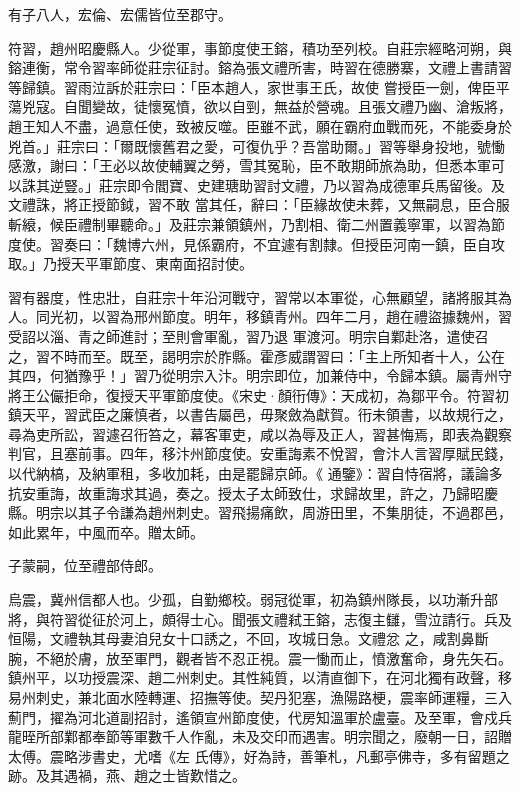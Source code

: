 \begin{pinyinscope}
 有子八人，宏倫、宏儒皆位至郡守。



 符習，趙州昭慶縣人。少從軍，事節度使王鎔，積功至列校。自莊宗經略河朔，與鎔連衡，常令習率師從莊宗征討。鎔為張文禮所害，時習在德勝寨，文禮上書請習等歸鎮。習雨泣訴於莊宗曰：「臣本趙人，家世事王氏，故使
 嘗授臣一劍，俾臣平蕩兇寇。自聞變故，徒懷冤憤，欲以自剄，無益於營魂。且張文禮乃幽、滄叛將，趙王知人不盡，過意任使，致被反噬。臣雖不武，願在霸府血戰而死，不能委身於兇首。」莊宗曰：「爾既懷舊君之愛，可復仇乎？吾當助爾。」習等舉身投地，號慟感激，謝曰：「王必以故使輔翼之勞，雪其冤恥，臣不敢期師旅為助，但悉本軍可以誅其逆豎。」莊宗即令閻寶、史建瑭助習討文禮，乃以習為成德軍兵馬留後。及文禮誅，將正授節鉞，習不敢
 當其任，辭曰：「臣緣故使未葬，又無嗣息，臣合服斬縗，候臣禮制畢聽命。」及莊宗兼領鎮州，乃割相、衛二州置義寧軍，以習為節度使。習奏曰：「魏博六州，見係霸府，不宜遽有割隸。但授臣河南一鎮，臣自攻取。」乃授天平軍節度、東南面招討使。



 習有器度，性忠壯，自莊宗十年沿河戰守，習常以本軍從，心無顧望，諸將服其為人。同光初，以習為邢州節度。明年，移鎮青州。四年二月，趙在禮盜據魏州，習受詔以淄、青之師進討；至則會軍亂，習乃退
 軍渡河。明宗自鄴赴洛，遣使召之，習不時而至。既至，謁明宗於胙縣。霍彥威謂習曰：「主上所知者十人，公在其四，何猶豫乎！」習乃從明宗入汴。明宗即位，加兼侍中，令歸本鎮。屬青州守將王公儼拒命，復授天平軍節度使。《宋史·顏衎傳》：天成初，為鄒平令。符習初鎮天平，習武臣之廉慎者，以書告屬邑，毋聚斂為獻賀。衎未領書，以故規行之，尋為吏所訟，習遽召衎笞之，幕客軍吏，咸以為辱及正人，習甚悔焉，即表為觀察判官，且塞前事。四年，移汴州節度使。安重誨素不悅習，會汴人言習厚賦民錢，以代納槁，及納軍租，多收加耗，由是罷歸京師。《
 通鑒》：習自恃宿將，議論多抗安重誨，故重誨求其過，奏之。授太子太師致仕，求歸故里，許之，乃歸昭慶縣。明宗以其子令謙為趙州刺史。習飛揚痛飲，周游田里，不集朋徒，不過郡邑，如此累年，中風而卒。贈太師。



 子蒙嗣，位至禮部侍郎。



 烏震，冀州信都人也。少孤，自勤鄉校。弱冠從軍，初為鎮州隊長，以功漸升部將，與符習從征於河上，頗得士心。聞張文禮弒王鎔，志復主讎，雪泣請行。兵及恒陽，文禮執其母妻洎兒女十口誘之，不回，攻城日急。文禮忿
 之，咸割鼻斷腕，不絕於膚，放至軍門，觀者皆不忍正視。震一慟而止，憤激奮命，身先矢石。鎮州平，以功授震深、趙二州刺史。其性純質，以清直御下，在河北獨有政聲，移易州刺史，兼北面水陸轉運、招撫等使。契丹犯塞，漁陽路梗，震率師運糧，三入薊門，擢為河北道副招討，遙領宣州節度使，代房知溫軍於盧臺。及至軍，會戍兵龍晊所部鄴都奉節等軍數千人作亂，未及交印而遇害。明宗聞之，廢朝一日，詔贈太傅。震略涉書史，尤嗜《左
 氏傳》，好為詩，善筆札，凡郵亭佛寺，多有留題之跡。及其遇禍，燕、趙之士皆歎惜之。




\end{pinyinscope}
